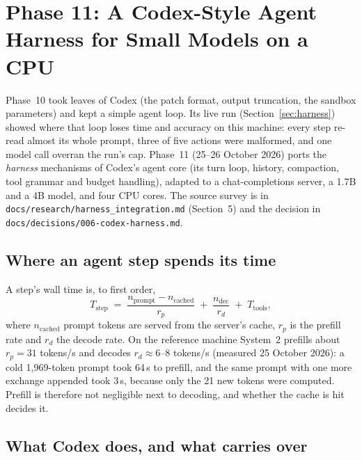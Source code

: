 \section{Phase 11: A Codex-Style Agent Harness for Small Models on a CPU}
\label{sec:harness2}

Phase~10 took leaves of Codex (the patch format, output truncation, the sandbox
parameters) and kept a simple agent loop. Its live run (Section~\ref{sec:harness})
showed where that loop loses time and accuracy on this machine: every step
re-read almost its whole prompt, three of five actions were malformed, and one
model call overran the run's cap. Phase~11 (25--26 October 2026) ports the
\emph{harness} mechanisms of Codex's agent core \cite{openaicodex2026} (its turn
loop, history, compaction, tool grammar and budget handling), adapted to a
chat-completions server, a 1.7B and a 4B model, and four CPU cores. The source
survey is in \texttt{docs/research/harness\_integration.md} (Section~5) and the
decision in \texttt{docs/decisions/006-codex-harness.md}.

\subsection{Where an agent step spends its time}

A step's wall time is, to first order,
\begin{equation}
T_{\text{step}} \;=\; \frac{n_{\text{prompt}}-n_{\text{cached}}}{r_p} \;+\; \frac{n_{\text{dec}}}{r_d} \;+\; T_{\text{tools}},
\label{eq:stepcost}
\end{equation}
where $n_{\text{cached}}$ prompt tokens are served from the server's cache, $r_p$
is the prefill rate and $r_d$ the decode rate. On the reference machine System~2
prefills about $r_p=31$ tokens/s and decodes $r_d\approx6$--$8$ tokens/s
(measured 25 October 2026): a cold 1{,}969-token prompt took 64\,s to prefill, and
the same prompt with one more exchange appended took 3\,s, because only the 21 new
tokens were computed. Prefill is therefore not negligible next to decoding, and
whether the cache is hit decides it.

\subsection{What Codex does, and what carries over}


